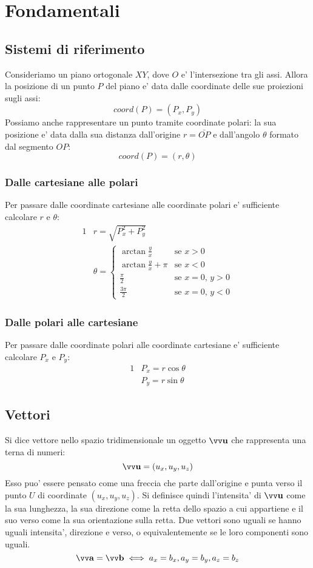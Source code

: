 \chapter{Fondamentali}

\section{Sistemi di riferimento}
Consideriamo un piano ortogonale $XY$, dove $O$ e' l'intersezione tra gli assi. 
Allora la posizione di un punto $P$ del piano e' data dalle coordinate delle sue proiezioni sugli assi:
\[coord(P) = (P_x, P_y)\]
Possiamo anche rappresentare un punto tramite coordinate polari: la sua posizione e' data dalla sua distanza dall'origine $r = \bar{OP}$ e 
dall'angolo $\theta$ formato dal segmento $OP$:
\[coord(P) = (r, \theta)\]
\subsection{Dalle cartesiane alle polari}
Per passare dalle coordinate cartesiane alle coordinate polari e' sufficiente calcolare $r$ e $\theta$:
\begin{alignat*}{1}   
    &r = \sqrt{P_x^2 + P_y^2} \\
    &\theta =   \begin{cases}
                    \arctan{\frac{y}{x}}            &\text{se } x > 0 \\
                    \arctan{\frac{y}{x}} + \pi      &\text{se } x < 0 \\
                    \frac{\pi}{2}                   &\text{se } x = 0 \text{, } y > 0\\
                    \frac{3\pi}{2}                  &\text{se } x = 0 \text{, } y < 0
                \end{cases}
\end{alignat*}  
\subsection{Dalle polari alle cartesiane}
Per passare dalle coordinate polari alle coordinate cartesiane e' sufficiente calcolare $P_x$ e $P_y$:
\begin{alignat*}{1}   
    &P_x = r\cos{\theta} \\
    &P_y = r\sin{\theta}
\end{alignat*}  

\section{Vettori}
Si dice vettore nello spazio tridimensionale un oggetto $\bvv{u}$ che rappresenta una terna di numeri:
\[\bvv{u} = (u_x, u_y, u_z)\]
Esso puo' essere pensato come una freccia che parte dall'origine e punta verso il punto $U$ di coordinate $(u_x, u_y, u_z)$.
Si definisce quindi l'intensita' di $\bvv{u}$ come la sua lunghezza, la sua direzione come la retta dello spazio a cui appartiene e il 
suo verso come la sua orientazione sulla retta. \newline
Due vettori sono uguali se hanno uguali intensita', direzione e verso, o equivalentemente se le loro componenti sono uguali.
\[\bvv{a} = \bvv{b} \iff a_x = b_x, a_y = b_y, a_z = b_z\]

